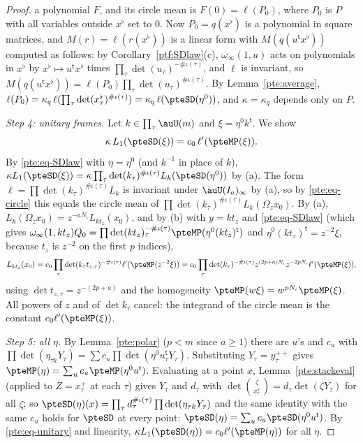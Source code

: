 \documentclass[10pt]{amsart}
\theoremstyle{definition}
\theoremstyle{remark}
\begin{document}
\begin{proof}
a polynomial $F$, and its circle mean is $F(0)=\ell(P_0)$, where $P_0$ is $P$ with all variables outside
$x^\flat$ set to $0$. Now $P_0=q(x^\flat)$ is a polynomial in square matrices, and $M(r)=\ell(r(x^\flat))$
is a linear form with $M(q(u^{\mathsf t}x^\flat))$ computed as follows: by
Corollary~\ref{ptf:SDlaw}(c), $\omega_\infty(1,u)$ acts on polynomials in $x^\flat$ by $x^\flat\mapsto u^{\mathsf t}x^\flat$
times $\prod_\tau\det(u_\tau)^{-\#\iota(\tau)}$, and $\ell$ is
invariant, so $M(q(u^{\mathsf t}x^\flat))=\ell(P_0)\prod_\tau\det(u_\tau)^{\#\iota(\tau)}$. By
Lemma~\ref{pte:average}, $\ell(P_0)=\kappa_q\,\ell(\prod_\tau\det(x^\flat_\tau)^{\#\iota(\tau)})=\kappa_q
\,\ell(\pteSD(\eta^0))$, and $\kappa=\kappa_q$ depends only on $P$.

\emph{Step 4: unitary frames.} Let $k\in\prod_\tau\auU(m)$ and $\xi=\eta^0k^{\mathsf t}$. We show
\begin{equation}\label{pte:eq-unitary}
\kappa\,L_1(\pteSD(\xi))=c_0\,\ell'(\pteMP(\xi)).
\end{equation}
By \eqref{pte:eq-SDlaw} with $\eta=\eta^0$ (and $k^{-1}$ in place of $k$),
$\kappa L_1(\pteSD(\xi))=\kappa\prod_\tau\det(k_\tau)^{\#\iota(\tau)}L_{k}(\pteSD(\eta^0))$ by (a). The
form $\ell=\prod\det(k_\tau)^{\#\iota(\tau)}L_k$ is invariant under $\auU(I_a)_\infty$ by (a), so by
\eqref{pte:eq-circle} this equals the circle mean of $\prod\det(k_\tau)^{\#\iota(\tau)}L_k(\Omega_z x_0)$.
By (a), $L_k(\Omega_zx_0)=z^{-aN_\iota}L_{kt_z}(x_0)$, and by (b) with $y=kt_z$ and \eqref{pte:eq-SDlaw}
(which gives $\omega_\infty(1,kt_z)Q_0=\prod\det(kt_z)_\tau^{-\#\iota(\tau)}\pteMP(\eta^0(kt_z)^{\mathsf t})$ and
$\eta^0(kt_z)^{\mathsf t}=z^{-2}\xi$, because $t_z$ is $z^{-2}$ on the first $p$ indices),
\[
L_{kt_z}(x_0)=c_0\prod_\tau\det(k_\tau t_{z,\tau})^{-\#\iota(\tau)}\ell'(\pteMP(z^{-2}\xi))
=c_0\prod_\tau\det(k_\tau)^{-\#\iota(\tau)}z^{(2p+a)N_\iota}z^{-2pN_\iota}\ell'(\pteMP(\xi)),
\]
using $\det t_{z,\tau}=z^{-(2p+a)}$ and the homogeneity $\pteMP(w\xi)=w^{pN_\iota}\pteMP(\xi)$. All powers
of $z$ and of $\det k_\tau$ cancel: the integrand of the circle mean is the constant $c_0\ell'(\pteMP(\xi))$.

\emph{Step 5: all $\eta$.} By Lemma~\ref{pte:polar} ($p<m$ since $a\ge1$) there are $u$'s and $c_u$
with $\prod\det(\eta_{\tau k}Y_\tau)=\sum c_u\prod\det(\eta^0u_\tau^{\mathsf t}Y_\tau)$. Substituting
$Y_\tau=y^{++}_\tau$ gives $\pteMP(\eta)=\sum_uc_u\pteMP(\eta^0u^{\mathsf t})$. Evaluating at a point
$x$, Lemma~\ref{pte:stackeval} (applied to $Z=x^+_\tau$ at each $\tau$) gives $Y_\tau$ and $d_\tau$
with $\det\binom{\zeta}{x^+_\tau}=d_\tau\det(\zeta Y_\tau)$ for all $\zeta$; so $\pteSD(\eta)(x)=
\prod_\tau d_\tau^{\#\iota(\tau)}\prod\det(\eta_{\tau k}Y_\tau)$ and the same identity with the same
$c_u$ holds for $\pteSD$ at every point: $\pteSD(\eta)=\sum_uc_u\pteSD(\eta^0u^{\mathsf t})$. By
\eqref{pte:eq-unitary} and linearity, $\kappa L_1(\pteSD(\eta))=c_0\ell'(\pteMP(\eta))$ for all $\eta$.


\end{proof}
\end{document}
